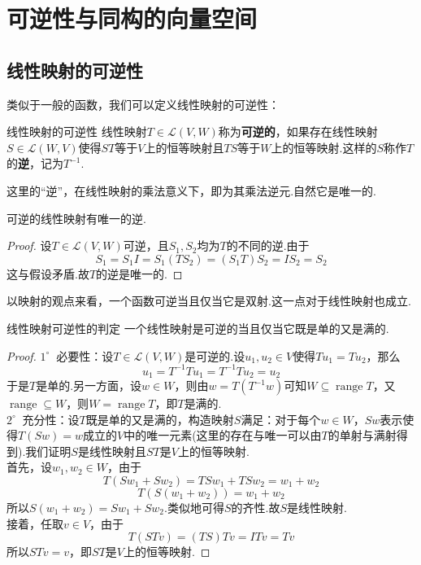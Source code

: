 \documentclass[lang=cn, zihao=5]{elegantbook}
\newcommand{\lmap}{\mathcal{L}}
\newcommand{\buzhou}[1]{$#1^{\circ} \ $}
\DeclareMathOperator{\rge}{range}
\begin{document}
\section{可逆性与同构的向量空间}

\subsection{线性映射的可逆性}

类似于一般的函数，我们可以定义线性映射的可逆性：

\begin{definition}{线性映射的可逆性}
	线性映射$T \in \lmap (V,W)$称为\textbf{可逆的}，如果存在线性映射$S \in \lmap (W,V)$使得$ST$等于$V$上的恒等映射且$TS$等于$W$上的恒等映射.这样的$S$称作$T$的\textbf{逆}，记为$T^{-1}$.
\end{definition}

这里的“逆”，在线性映射的乘法意义下，即为其乘法逆元.自然它是唯一的.

\begin{proposition}
	可逆的线性映射有唯一的逆.
\end{proposition}
\begin{proof}
	设$T \in \lmap (V,W)$可逆，且$S_1,S_2$均为$T$的不同的逆.由于$$S_1 = S_1I = S_1(TS_2) = (S_1T)S_2 = IS_2 = S_2$$
	这与假设矛盾.故$T$的逆是唯一的.
\end{proof}

以映射的观点来看，一个函数可逆当且仅当它是双射.这一点对于线性映射也成立.

\begin{proposition}{线性映射可逆性的判定}
	一个线性映射是可逆的当且仅当它既是单的又是满的.
\end{proposition}
\begin{proof}
	\buzhou{1} 必要性：设$T \in \lmap (V,W)$是可逆的.设$u_1,u_2 \in V$使得$Tu_1 = Tu_2$，那么$$u_1 = T^{-1} T u_1 = T^{-1} T u_2 = u_2$$
	于是$T$是单的.另一方面，设$w \in W$，则由$w = T(T^{-1}w)$可知$W \subseteq \rge T$，又$\rge \subseteq W$，则$W = \rge T$，即$T$是满的. \\
	\buzhou{2} 充分性：设$T$既是单的又是满的，构造映射$S$满足：对于每个$w \in W$，$Sw$表示使得$T(Sw)=w$成立的$V$中的唯一元素(这里的存在与唯一可以由$T$的单射与满射得到).我们证明$S$是线性映射且$ST$是$V$上的恒等映射. \\
	首先，设$w_1,w_2 \in W$，由于$$T(Sw_1+Sw_2)=TSw_1 + TSw_2 = w_1 + w_2$$
	$$T(S(w_1+w_2)) = w_1+w_2$$
	所以$S(w_1+w_2)=Sw_1 + Sw_2$.类似地可得$S$的齐性.故$S$是线性映射. \\
	接着，任取$v \in V$，由于$$T(STv) = (TS)Tv=ITv=Tv$$
	所以$STv=v$，即$ST$是$V$上的恒等映射.
\end{proof}
\end{document}
